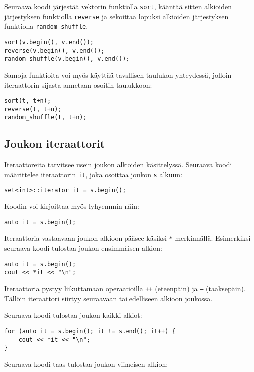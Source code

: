 Seuraava koodi järjestää vektorin funktiolla \texttt{sort},
kääntää sitten alkioiden järjestyksen funktiolla \texttt{reverse}
ja sekoittaa lopuksi alkioiden järjestyksen funktiolla \texttt{random\_shuffle}.

\begin{lstlisting}
sort(v.begin(), v.end());
reverse(v.begin(), v.end());
random_shuffle(v.begin(), v.end());
\end{lstlisting}

Samoja funktioita voi myös käyttää tavallisen taulukon
yhteydessä, jolloin iteraattorin sijasta annetaan
osoitin taulukkoon:

\begin{lstlisting}
sort(t, t+n);
reverse(t, t+n);
random_shuffle(t, t+n);
\end{lstlisting}

\subsection{Joukon iteraattorit}

Iteraattoreita tarvitsee usein joukon
alkioiden käsittelyssä.
Seuraava koodi määrittelee iteraattorin
\texttt{it}, joka osoittaa joukon \texttt{s} alkuun:

\begin{lstlisting}
set<int>::iterator it = s.begin();
\end{lstlisting}

Koodin voi kirjoittaa myös lyhyemmin näin:

\begin{lstlisting}
auto it = s.begin();
\end{lstlisting}
Iteraattoria vastaavaan joukon alkioon
pääsee käsiksi \texttt{*}-merkinnällä.
Esimerkiksi seuraava koodi tulostaa
joukon ensimmäisen alkion:

\begin{lstlisting}
auto it = s.begin();
cout << *it << "\n";
\end{lstlisting}
Iteraattoria pystyy liikuttamaan
operaatioilla \texttt{++} (eteenpäin)
ja \texttt{---} (taaksepäin).
Tällöin iteraattori siirtyy seuraavaan
tai edelliseen alkioon joukossa.

Seuraava koodi tulostaa joukon kaikki alkiot:

\begin{lstlisting}
for (auto it = s.begin(); it != s.end(); it++) {
    cout << *it << "\n";
}
\end{lstlisting}
Seuraava koodi taas tulostaa joukon
viimeisen alkion:

